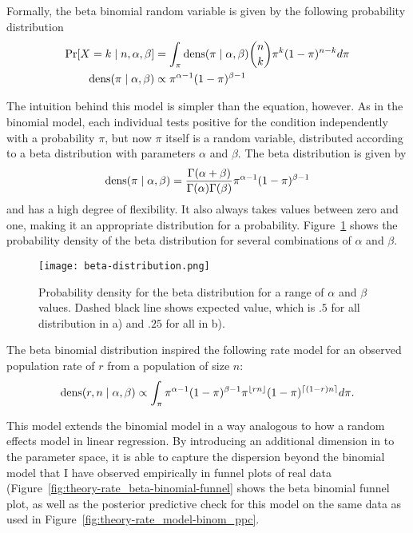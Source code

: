 Formally, the beta binomial random variable is given by the following
probability distribution
\begin{align*}
\operatorname{Pr}[X = k\;|\; n, \alpha, \beta] 
  &= \int_{\pi}\operatorname{dens}(\pi\;|\; \alpha, \beta) \binom{n}{k}\pi^k(1-\pi)^{n-k}
d\pi\\
\operatorname{dens}(\pi\;|\; \alpha, \beta) &\propto \pi^{\alpha-1}(1-\pi)^{\beta-1}
\end{align*}

The intuition behind this model is simpler than the equation, however.
As in the binomial model, each individual tests positive for the condition independently
with a probability $\pi$, but now $\pi$ itself is a random variable,
distributed according to a beta distribution with parameters $\alpha$
and $\beta$. The beta distribution is given by 
\[
\operatorname{dens}(\pi\;|\; \alpha, \beta) =
\frac{\Gamma(\alpha+\beta)}{\Gamma(\alpha)\Gamma(\beta)}\pi^{\alpha-1}(1-\pi)^{\beta-1}
\]
and has a high degree of flexibility.  It also always takes values
between zero and one, making it an appropriate distribution for a
probability.  Figure~\ref{fig:theory-rate_model-beta} shows the
probability density of the beta distribution for several combinations
of $\alpha$ and $\beta$.
\begin{figure}[ht]
\begin{center}
\texttt{[image: beta-distribution.png]}
\end{center}
\caption{Probability density for the beta distribution for a range of
  $\alpha$ and $\beta$ values. Dashed black line shows expected value,
which is $.5$ for all distribution in a) and $.25$ for all in b).}
\label{fig:theory-rate_model-beta}
\end{figure}

The beta binomial distribution inspired the following rate model for
an observed population rate of $r$ from a population of size $n$:
\[
\operatorname{dens}(r,n\;|\; \alpha, \beta) \propto \int_{\pi}
\pi^{\alpha-1}(1-\pi)^{\beta-1} \pi^{\lfloor rn\rfloor} (1-\pi)^{\lceil (1-r)n\rceil}
d\pi.
\]

This model extends the binomial model in a way analogous to how a
random effects model in linear regression.  By introducing an
additional dimension in to the parameter space, it is able to capture
the dispersion beyond the binomial model that I have observed
empirically in funnel plots of real data
(Figure~\ref{fig:theory-rate_beta-binomial-funnel} shows the beta
binomial funnel plot, as well as the posterior predictive check for
this model on the same data as used in
Figure~\ref{fig:theory-rate_model-binom_ppc}.

